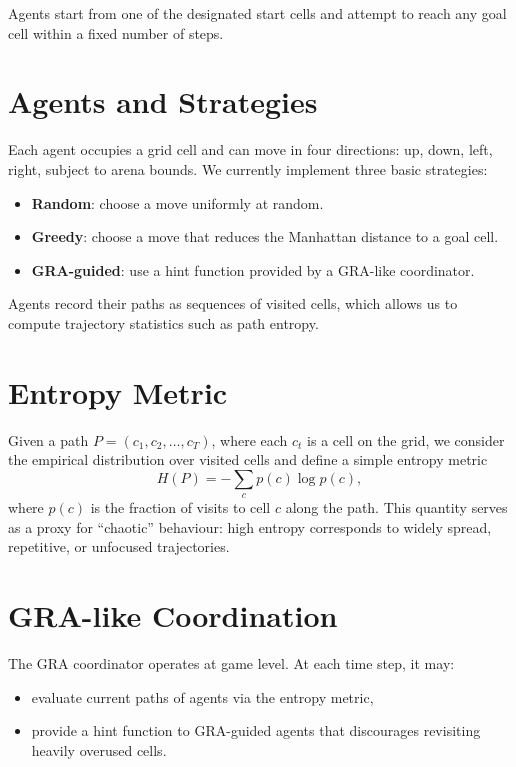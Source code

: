 \documentclass[11pt]{article}
\begin{document}
Agents start from one of the designated start cells and attempt to reach any goal cell within
a fixed number of steps.

\section{Agents and Strategies}

Each agent occupies a grid cell and can move in four directions: up, down, left, right,
subject to arena bounds.
We currently implement three basic strategies:
\begin{itemize}
  \item \textbf{Random}: choose a move uniformly at random.
  \item \textbf{Greedy}: choose a move that reduces the Manhattan distance to a goal cell.
  \item \textbf{GRA-guided}: use a hint function provided by a GRA-like coordinator.
\end{itemize}

Agents record their paths as sequences of visited cells, which allows us to compute
trajectory statistics such as path entropy.

\section{Entropy Metric}

Given a path $P = (c_1, c_2, \dots, c_T)$, where each $c_t$ is a cell on the grid,
we consider the empirical distribution over visited cells and define a simple
entropy metric
\[
H(P) = - \sum_{c} p(c) \log p(c),
\]
where $p(c)$ is the fraction of visits to cell $c$ along the path.
This quantity serves as a proxy for ``chaotic'' behaviour: high entropy corresponds
to widely spread, repetitive, or unfocused trajectories.

\section{GRA-like Coordination}

The GRA coordinator operates at game level.
At each time step, it may:
\begin{itemize}
  \item evaluate current paths of agents via the entropy metric,
  \item provide a hint function to GRA-guided agents that discourages revisiting
        heavily overused cells.
\end{itemize}
\end{document}
